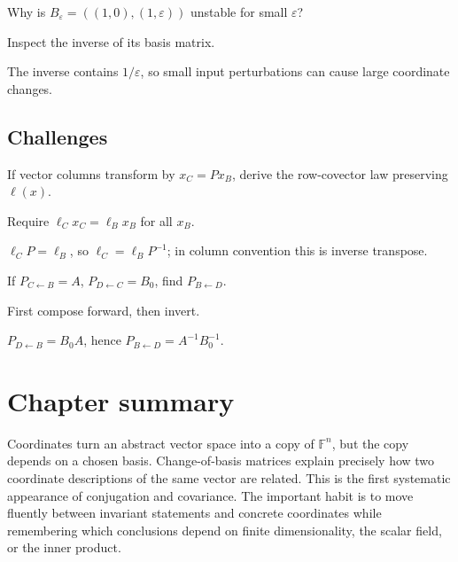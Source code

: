 \begin{exercise}\label{exr:i04-expand-14}
Why is \(B_\varepsilon=((1,0),(1,\varepsilon))\) unstable for small \(\varepsilon\)?
\end{exercise}
\begin{hint}
Inspect the inverse of its basis matrix.
\end{hint}
\begin{solution}
The inverse contains \(1/\varepsilon\), so small input perturbations can cause large coordinate changes.
\end{solution}

\subsection*{Challenges}

\begin{exercise}\label{exr:i04-expand-15}
If vector columns transform by \(x_C=Px_B\), derive the row-covector law preserving \(\ell(x)\).
\end{exercise}
\begin{hint}
Require \(\ell_Cx_C=\ell_Bx_B\) for all \(x_B\).
\end{hint}
\begin{solution}
\(\ell_CP=\ell_B\), so \(\ell_C=\ell_BP^{-1}\); in column convention this is inverse transpose.
\end{solution}

\begin{exercise}\label{exr:i04-expand-16}
If \(P_{C\leftarrow B}=A\), \(P_{D\leftarrow C}=B_0\), find \(P_{B\leftarrow D}\).
\end{exercise}
\begin{hint}
First compose forward, then invert.
\end{hint}
\begin{solution}
\(P_{D\leftarrow B}=B_0A\), hence \(P_{B\leftarrow D}=A^{-1}B_0^{-1}\).
\end{solution}
\section*{Chapter summary}
Coordinates turn an abstract vector space into a copy of $\mathbb F^n$, but the copy depends on a chosen basis. Change-of-basis matrices explain precisely how two coordinate descriptions of the same vector are related. This is the first systematic appearance of conjugation and covariance.
The important habit is to move fluently between invariant statements and concrete coordinates while remembering which conclusions depend on finite dimensionality, the scalar field, or the inner product.
